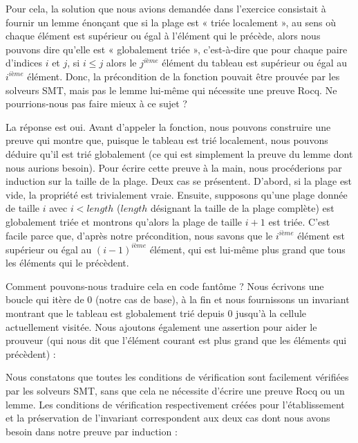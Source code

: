 

Pour cela, la solution que nous avions demandée dans l'exercice consistait à fournir
un lemme énonçant que si la plage est « triée localement », au sens où chaque
élément est supérieur ou égal à l'élément qui le précède, alors nous pouvons
dire qu'elle est « globalement triée », c'est-à-dire que pour chaque paire
d'indices $i$ et $j$, si $i \leq j$ alors le $j^{ième}$ élément du tableau est
supérieur ou égal au $i^{ième}$ élément. Donc, la précondition de la fonction
pouvait être prouvée par les solveurs SMT, mais pas le lemme lui-même qui
nécessite une preuve Rocq. Ne pourrions-nous pas faire mieux à ce sujet ?


La réponse est oui. Avant d'appeler la fonction, nous pouvons construire une
preuve qui montre que, puisque le tableau est trié localement, nous pouvons
déduire qu'il est trié globalement (ce qui est simplement la preuve du lemme
dont nous aurions besoin). Pour écrire cette preuve à la main, nous procéderions
par induction sur la taille de la plage. Deux cas se présentent. D'abord, si la
plage est vide, la propriété est trivialement vraie. Ensuite, supposons qu'une
plage donnée de taille $i$ avec $i < length$ ($length$ désignant la taille de la
plage complète) est globalement triée et montrons qu'alors la
plage de taille $i+1$ est triée. C'est facile parce que, d'après notre
précondition, nous savons que le $i^{ième}$ élément est supérieur ou égal au
$(i-1)^{ième}$ élément, qui est lui-même plus grand que tous les éléments qui
le précèdent.


Comment pouvons-nous traduire cela en code fantôme ? Nous écrivons une boucle qui
itère de $0$ (notre cas de base), à la fin  et nous fournissons
un invariant montrant que le tableau est globalement trié depuis $0$ jusqu'à la
cellule actuellement visitée. Nous ajoutons également une assertion pour aider le
prouveur (qui nous dit que l'élément courant est plus grand que les éléments qui
précèdent) :






Nous constatons que toutes les conditions de vérification sont facilement
vérifiées par les solveurs SMT, sans que cela ne nécessite d'écrire une preuve Rocq
ou un lemme. Les conditions de vérification respectivement créées pour
l'établissement et la préservation de l'invariant correspondent aux deux cas dont
nous avons besoin dans notre preuve par induction :


